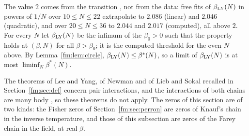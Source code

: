 The value $2$ comes from the transition \cite{ContucciKnauf97,FialaKO03}, not from the data: free fits of $\beta_{\rm LY}(N)$ in powers of $1/N$ over $10\le N\le22$ extrapolate to $2.086$ (linear) and $2.046$ (quadratic), and over $20\le N\le36$ to $2.044$ and $2.017$ (computed), all above $2$. For every $N$ let $\beta_{\rm LY}(N)$ be the infimum of the $\beta_0>0$ such that the property holds at $(\beta,N)$ for all $\beta>\beta_0$; it is the computed threshold for the even $N$ above. By Lemma~\ref{fm:lem:circle}, $\beta_{\rm LY}(N)\le\beta^*(N)$, so a limit of $\beta_{\rm LY}(N)$ is at most $\liminf_N\beta^*(N)$.

The theorems of Lee and Yang, of Newman and of Lieb and Sokal recalled in Section~\ref{fm:sec:def} concern pair interactions, and the interactions of both chains are many body \cite{Knauf93,KlebanOzluk99}, so these theorems do not apply. The zeros of this section are of two kinds: the Fisher zeros of Section~\ref{fm:sec:perron} are zeros of Knauf's chain in the inverse temperature, and those of this subsection are zeros of the Farey chain in the field, at real $\beta$.

